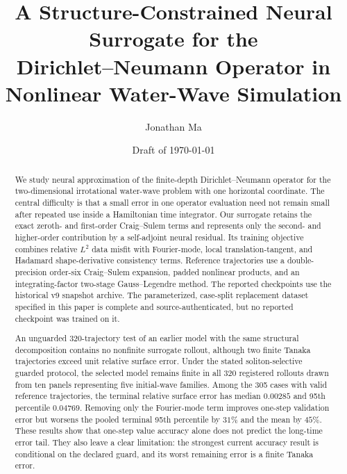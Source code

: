 \documentclass[11pt]{article}
\title{A Structure-Constrained Neural Surrogate for the\\
Dirichlet--Neumann Operator in Nonlinear Water-Wave Simulation}
\author{Jonathan Ma}
\date{Draft of \today}
\begin{document}
\maketitle

\begin{abstract}
We study neural approximation of the finite-depth Dirichlet--Neumann operator
for the two-dimensional irrotational water-wave problem with one horizontal
coordinate.
The central difficulty is that a small error in one operator evaluation need
not remain small after repeated use inside a Hamiltonian time integrator.  Our
surrogate retains the exact zeroth- and first-order Craig--Sulem terms and
represents only the second- and higher-order contribution by a self-adjoint
neural residual.  Its training objective combines relative $L^2$ data
misfit with Fourier-mode, local translation-tangent, and Hadamard
shape-derivative consistency terms.  Reference trajectories use a
double-precision order-six Craig--Sulem expansion, padded nonlinear products,
and an integrating-factor two-stage Gauss--Legendre method.  The reported
checkpoints use the historical v9 snapshot archive.  The parameterized,
case-split replacement dataset specified in this paper is complete and
source-authenticated, but no reported checkpoint was trained on it.

An unguarded 320-trajectory test of an earlier model with the same structural
decomposition contains no nonfinite surrogate rollout, although two finite
Tanaka trajectories exceed unit relative surface error.  Under the stated
soliton-selective guarded protocol, the selected model remains finite in all
320 registered rollouts drawn from ten panels representing five initial-wave
families.  Among the 305 cases with valid reference trajectories, the terminal
relative surface error has median $0.00285$ and 95th percentile $0.04769$.
Removing only the Fourier-mode term improves one-step validation error but
worsens the pooled terminal 95th percentile by $31\%$ and the mean by $45\%$.
These results show that one-step value accuracy alone does not predict the
long-time error tail.  They also leave a clear limitation: the strongest
current accuracy result is conditional on the declared guard, and its worst
remaining error is a finite Tanaka error.
\end{abstract}









\appendix





\end{document}
